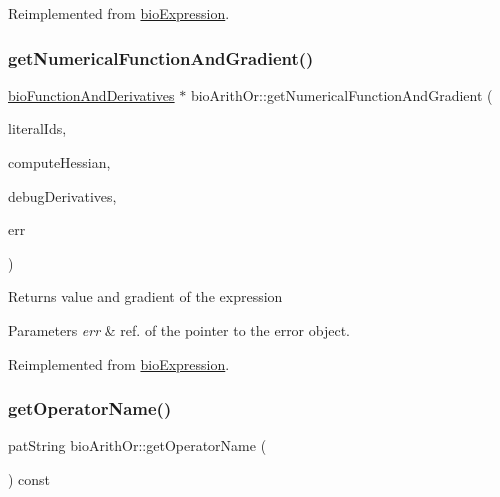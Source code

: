 Reimplemented from \hyperlink{classbio_expression_a3e4b4dca58dbbc6f0e411b30eb3f60b4}{bio\+Expression}.

\mbox{\label{classbio_arith_or_a584c8a964a188ca03db9cf69400af290}} 
\subsubsection{\texorpdfstring{get\+Numerical\+Function\+And\+Gradient()}{getNumericalFunctionAndGradient()}}
{\footnotesize\ttfamily \hyperlink{classbio_function_and_derivatives}{bio\+Function\+And\+Derivatives} $\ast$ bio\+Arith\+Or\+::get\+Numerical\+Function\+And\+Gradient (\begin{DoxyParamCaption}\item[{vector$<$ pat\+U\+Long $>$}]{literal\+Ids,  }\item[{pat\+Boolean}]{compute\+Hessian,  }\item[{pat\+Boolean}]{debug\+Derivatives,  }\item[{pat\+Error $\ast$\&}]{err }\end{DoxyParamCaption})\hspace{0.3cm}{\ttfamily [virtual]}}

\begin{DoxyReturn}{Returns}
value and gradient of the expression 
\end{DoxyReturn}

\begin{DoxyParams}{Parameters}
{\em err} & ref. of the pointer to the error object. \\
\hline
\end{DoxyParams}


Reimplemented from \hyperlink{classbio_expression_a91c81ce80c9e972c913b10f5f3c1ed13}{bio\+Expression}.

\mbox{\label{classbio_arith_or_afa8b3b4494ff72cdbbfda2012c56dc68}} 
\subsubsection{\texorpdfstring{get\+Operator\+Name()}{getOperatorName()}}
{\footnotesize\ttfamily pat\+String bio\+Arith\+Or\+::get\+Operator\+Name (\begin{DoxyParamCaption}{ }\end{DoxyParamCaption}) const\hspace{0.3cm}{\ttfamily [virtual]}}

